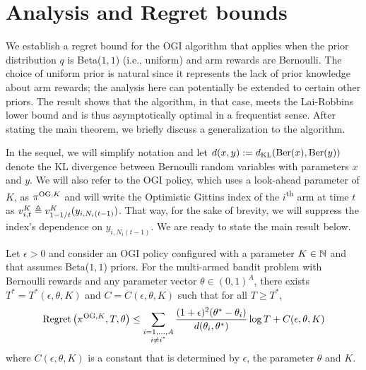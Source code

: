 \section{Analysis and Regret bounds} \label{sec:analysis_of_regret}
We establish a regret bound for the OGI algorithm that applies when the prior distribution $q$ is Beta($1,1$) (i.e., uniform) and arm rewards are Bernoulli. {\color{blue}The choice of uniform prior is natural since it represents the lack of prior knowledge about arm rewards; the analysis here can potentially be extended to certain other priors.}  The result shows that the algorithm, in that case, meets the Lai-Robbins lower bound and is thus asymptotically optimal in a frequentist sense. After stating the main theorem, we briefly discuss a generalization to the algorithm.  

In the sequel, we will simplify notation  and let $d(x,y) := d_{\rm KL}(\text{Ber}(x),\text{Ber}(y))$ denote the KL divergence between Bernoulli random variables with parameters $x$ and $y$. We will also refer to the OGI policy, which uses a look-ahead parameter of $K$, as $\pi^{{\rm OG},K}$ and will write the Optimistic Gittins index of the $i$\textsuperscript{th} arm at time $t$ as $v^K_{i,t} \triangleq v^K_{1-1/t}(y_{i,N_i(t-1)})$. That way, for the sake of brevity, we will suppress the index's dependence on $y_{i,N_i(t-1)}$. We are ready to state the main result below.
\begin{theorem} \label{thm:frequentist_optimal_bound}
	Let $\epsilon > 0$ and consider an OGI policy configured with a parameter $K \in \mathbb{N}$ and that assumes Beta($1,1$) priors. For the multi-armed bandit problem with Bernoulli rewards and any parameter vector {\color{blue}$\theta \in (0,1)^A$}, there exists $T^* = T^*(\epsilon, \theta, K)$ and $C = C(\epsilon,\theta, K)$ such that for all $T \ge T^*$,
	\begin{equation}
	\textnormal{Regret} \left( \pi^{{\rm OG},K}, T, \theta \right) \le \sum_{\substack{i=1,\ldots,A \\ i \ne i^*}} \frac{(1+\epsilon)^2(\theta^* - \theta_i)}{d(\theta_i, \theta^*)} \log T  + C(\epsilon,\theta, K)
	\end{equation}
	where $C(\epsilon,\theta, K)$ is a constant that is determined by $\epsilon$, the parameter $\theta$ and $K$.
\end{theorem}
